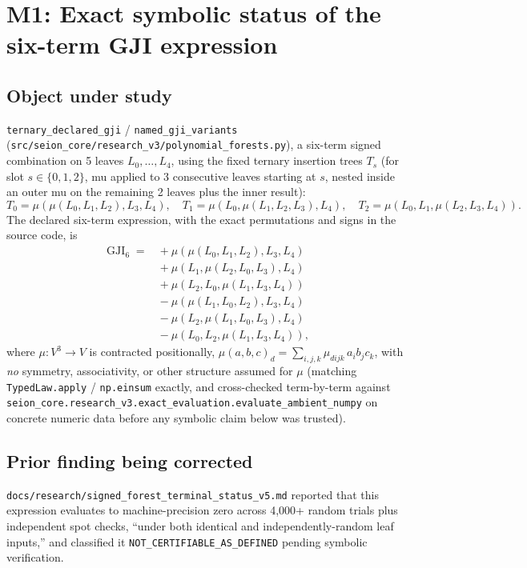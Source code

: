 \section*{M1: Exact symbolic status of the six-term GJI expression}

\subsection*{Object under study}

\texttt{ternary\_declared\_gji} / \texttt{named\_gji\_variants}
(\texttt{src/seion\_core/research\_v3/polynomial\_forests.py}), a six-term
signed combination on 5 leaves $L_0,\dots,L_4$, using the fixed ternary
insertion trees $T_s$ (for slot $s \in \{0,1,2\}$, mu applied to 3
consecutive leaves starting at $s$, nested inside an outer mu on the
remaining 2 leaves plus the inner result):
\[
  T_0 = \mu(\mu(L_0,L_1,L_2), L_3, L_4), \quad
  T_1 = \mu(L_0, \mu(L_1,L_2,L_3), L_4), \quad
  T_2 = \mu(L_0, L_1, \mu(L_2,L_3,L_4)).
\]
The declared six-term expression, with the exact permutations and signs
in the source code, is
\begin{align*}
  \mathrm{GJI}_6 \;=\;
    &+\ \mu(\mu(L_0,L_1,L_2), L_3, L_4) \\
    &+\ \mu(L_1, \mu(L_2,L_0,L_3), L_4) \\
    &+\ \mu(L_2, L_0, \mu(L_1,L_3,L_4)) \\
    &-\ \mu(\mu(L_1,L_0,L_2), L_3, L_4) \\
    &-\ \mu(L_2, \mu(L_1,L_0,L_3), L_4) \\
    &-\ \mu(L_0, L_2, \mu(L_1,L_3,L_4)),
\end{align*}
where $\mu : V^3 \to V$ is contracted positionally,
$\mu(a,b,c)_d = \sum_{i,j,k} \mu_{dijk}\, a_i b_j c_k$, with \emph{no}
symmetry, associativity, or other structure assumed for $\mu$ (matching
\texttt{TypedLaw.apply} / \texttt{np.einsum} exactly, and cross-checked
term-by-term against
\texttt{seion\_core.research\_v3.exact\_evaluation.evaluate\_ambient\_numpy}
on concrete numeric data before any symbolic claim below was trusted).

\subsection*{Prior finding being corrected}

\texttt{docs/research/signed\_forest\_terminal\_status\_v5.md} reported
that this expression evaluates to machine-precision zero across 4{,}000+
random trials plus independent spot checks, ``under both identical and
independently-random leaf inputs,'' and classified it
\texttt{NOT\_CERTIFIABLE\_AS\_DEFINED} pending symbolic verification.

